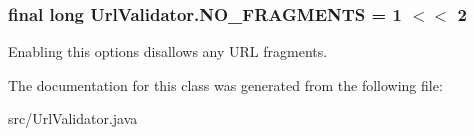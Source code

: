 \subsubsection[{\texorpdfstring{N\+O\+\_\+\+F\+R\+A\+G\+M\+E\+N\+TS}{NO_FRAGMENTS}}]{\setlength{\rightskip}{0pt plus 5cm}final long Url\+Validator.\+N\+O\+\_\+\+F\+R\+A\+G\+M\+E\+N\+TS = 1 $<$$<$ 2\hspace{0.3cm}{\ttfamily [static]}}\hypertarget{classUrlValidator_a9f6b028f570818955c807cfe97e29641}{}\label{classUrlValidator_a9f6b028f570818955c807cfe97e29641}
Enabling this options disallows any U\+RL fragments. 

The documentation for this class was generated from the following file\+:\begin{DoxyCompactItemize}
\item 
src/Url\+Validator.\+java\end{DoxyCompactItemize}
